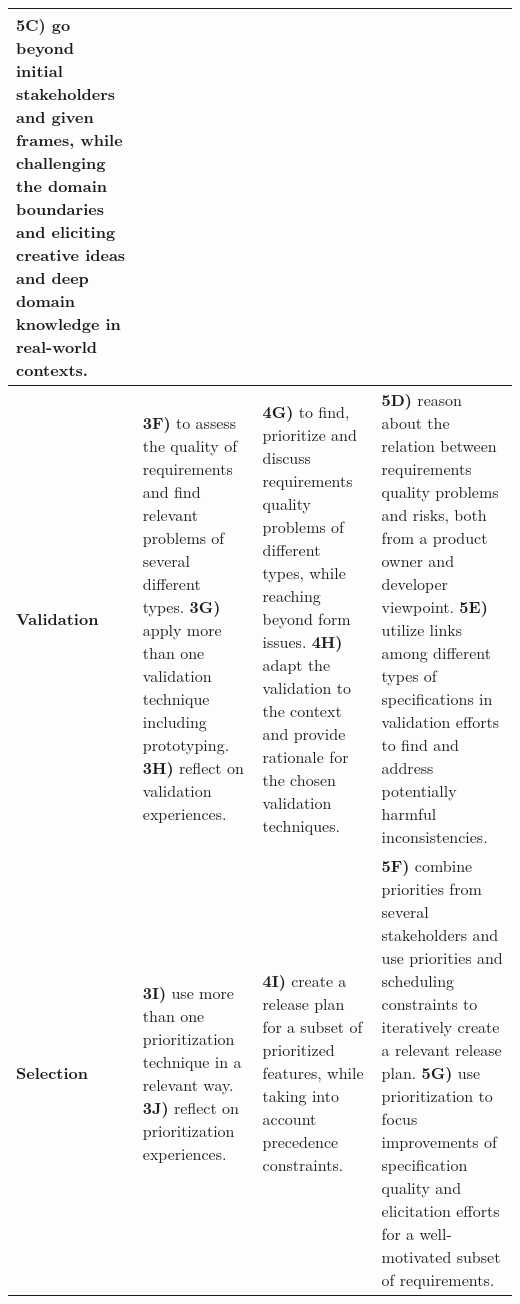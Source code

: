 \documentclass{project}
\begin{document}
\begin{adjustbox}{width=1.0\textwidth}
\begin{tabular}{| p{2.3cm} |p{6.2cm} | p{6.2cm} | p{6.2cm} |}
    {\bf 5C)} go beyond initial stakeholders and given frames, while challenging the domain boundaries and eliciting creative ideas and deep domain knowledge in real-world contexts.
\\ \hline

{\bf Validation}  &

    {\bf 3F)} to assess the quality of requirements and find relevant  problems of several different types. \newline
    {\bf 3G)} apply more than one validation technique including prototyping. \newline
    {\bf 3H)} reflect on validation experiences.&

    {\bf 4G)} to find, prioritize and discuss requirements quality problems of different types, while reaching beyond form issues. \newline
    {\bf 4H)} adapt the validation to the context and provide rationale for the chosen validation techniques. &

    {\bf 5D)} reason about the relation between requirements quality problems and risks, both from a product owner and developer viewpoint. \newline
    {\bf 5E)} utilize links among different types of specifications in validation efforts to find and address potentially harmful inconsistencies. \newline
\\ \hline

{\bf Selection}  &
  {\bf 3I)} use more than one prioritization technique in a relevant way. \newline
  {\bf 3J)} reflect on prioritization experiences.
&
  {\bf 4I)} create a release plan for a subset of prioritized features, while taking into account precedence constraints. \newline
&
  {\bf 5F)} combine priorities from several stakeholders and use priorities and scheduling constraints to iteratively create a relevant release plan.\newline
  {\bf 5G)} use prioritization to focus improvements of specification quality and elicitation efforts for a well-motivated subset of requirements.
\\ \hline

\end{tabular}

\end{adjustbox}

\end{document}
